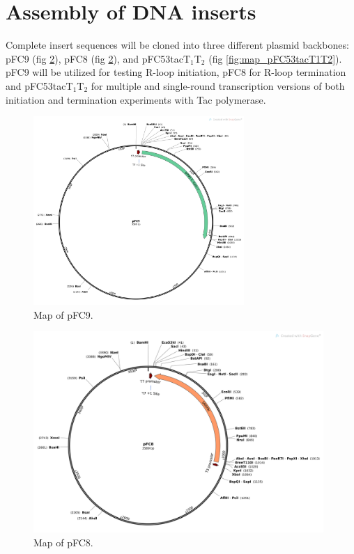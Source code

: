 \documentclass[11pt]{article}
\begin{document}
\section{Assembly of DNA inserts}

Complete insert sequences will be cloned into three different plasmid backbones: pFC9 (fig \ref{fig:map_pFC8}), pFC8 (fig \ref{fig:map_pFC8}), and pFC53tacT$_1$T$_2$ (fig \ref{fig:map_pFC53tacT1T2}). pFC9 will be utilized for testing R-loop initiation, pFC8 for R-loop termination and pFC53tacT$_1$T$_2$ for multiple and single-round transcription versions of both initiation and termination experiments with Tac polymerase. 


\begin{figure}[H]
	\includegraphics[width=8cm]{images/plasmid_maps/pFC9_Map.png}
	\centering
	\caption{Map of pFC9.}
	\label{fig:map_pFC9}
\end{figure}


\begin{figure}[H]
	\includegraphics[width=11cm]{images/plasmid_maps/pFC8_Map.png}
	\centering
	\caption{Map of pFC8.}
	\label{fig:map_pFC8}
\end{figure}
\end{document}
